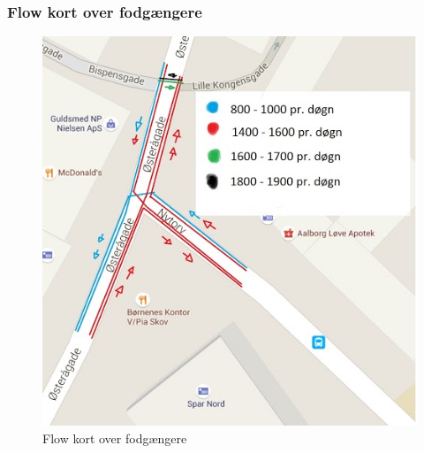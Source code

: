  \subsubsection{Flow kort over fodgængere}
 \begin{figure}[htbp]
   \label{fig:fodgaengere}
   \centering
   \begin{adjustbox}{max width=\textwidth}
     \includegraphics{billederogfigur/flowkortfod.jpg}
  \end{adjustbox}
   \caption{Flow kort over fodgængere}
 \end{figure}
 
